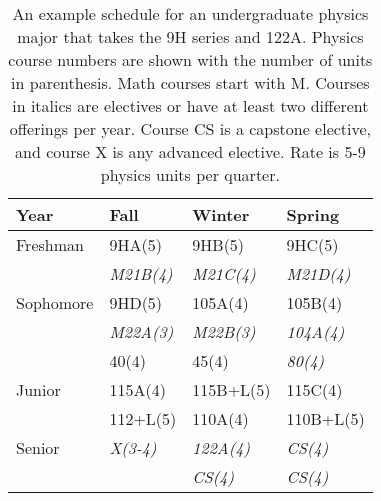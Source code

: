 \documentclass[12pt]{article}
\begin{document}
\begin{table}
\caption{
An example schedule for an undergraduate physics major that takes the 9H series and 122A. Physics course numbers are shown with the number of units in parenthesis.  Math courses start with M.  Courses in italics are electives or have at least two different offerings per year. Course CS is a capstone elective, and course X is any advanced elective.  Rate is 5-9 physics units per quarter.}
\label{tbl:proposed-honors}
\begin{center}
\begin{tabular}{|l|l|l|l|}
\hline
Year      & Fall    & Winter & Spring \\
\hline
Freshman  & 9HA(5)       & 9HB(5)        & 9HC(5) \\
          & {\it M21B(4)} & {\it M21C(4)}  & {\it M21D(4)}\\
\hline
Sophomore & 9HD(5)       & 105A(4)      & 105B(4) \\
          & {\it M22A(3)} & {\it M22B(3)} & {\it 104A(4)} \\
          & 40(4)        & 45(4)       & {\it 80(4)}  \\
\hline
Junior    & 115A(4) & 115B+L(5)  & 115C(4)\\
          & 112+L(5)  & 110A(4)  & 110B+L(5)\\
\hline
Senior    & {\it X(3-4)} & {\it 122A(4)} & {\it CS(4)} \\
          &              & {\it CS(4)} & {\it CS(4)} \\

\hline  
\end{tabular}
\end{center}
\end{table}
\end{document}

